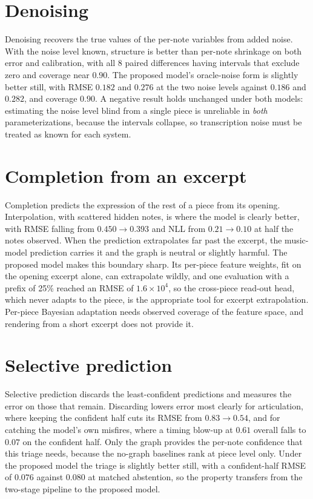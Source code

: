 \section{Denoising}
Denoising recovers the true values of the per-note variables from added
noise. With the noise level known, structure is better than per-note
shrinkage on both error and calibration, with all 8 paired differences having
intervals that exclude zero and coverage near $0.90$. The proposed model's
oracle-noise form is slightly better still, with RMSE $0.182$ and $0.276$ at
the two noise levels against $0.186$ and $0.282$, and coverage $0.90$. A
negative result holds unchanged under both models: estimating the noise level
blind from a single piece is unreliable in \emph{both} parameterizations,
because the intervals collapse, so transcription noise must be treated as
known for each system.

\section{Completion from an excerpt}
Completion predicts the expression of the rest of a piece from its opening.
Interpolation, with scattered hidden notes, is where the model is clearly
better, with RMSE falling from $0.450 \to 0.393$ and NLL from $0.21 \to 0.10$
at half the notes observed. When the prediction extrapolates far past the
excerpt, the music-model prediction carries it and the graph is neutral or
slightly harmful. The proposed model makes this boundary sharp. Its per-piece
feature weights, fit on the opening excerpt alone, can extrapolate wildly,
and one evaluation with a prefix of 25\% reached an RMSE of
$1.6\times 10^4$, so the cross-piece read-out head, which never adapts to the
piece, is the appropriate tool for excerpt extrapolation. Per-piece Bayesian
adaptation needs observed coverage of the feature space, and rendering from a
short excerpt does not provide it.

\section{Selective prediction}
Selective prediction discards the least-confident predictions and measures
the error on those that remain. Discarding lowers error most clearly for
articulation, where keeping the confident half cuts its RMSE from $0.83 \to
0.54$, and for catching the model's own misfires, where a timing blow-up at
$0.61$ overall falls to $0.07$ on the confident half. Only the graph provides
the per-note confidence that this triage needs, because the no-graph
baselines rank at piece level only. Under the proposed model the triage is
slightly better still, with a confident-half RMSE of $0.076$ against $0.080$
at matched abstention, so the property transfers from the two-stage pipeline
to the proposed model.

